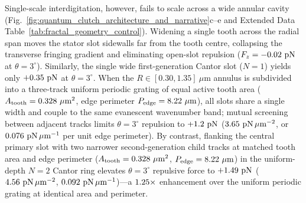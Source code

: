 \documentclass[pdflatex,sn-nature]{sn-jnl}
\DeclareRobustCommand{\roundtwo}[1]{\fpeval{round(#1,2)}}
\DeclareRobustCommand{\roundthree}[1]{\fpeval{round(#1,3)}}
\begin{document}
Single-scale interdigitation, however, fails to scale across a wide annular cavity (Fig.~\ref{fig:quantum_clutch_architecture_and_narrative}c--e and Extended Data Table~\ref{tab:fractal_geometry_control}). Widening a single tooth across the radial span moves the stator slot sidewalls far from the tooth centre, collapsing the transverse fringing gradient and eliminating open-slot repulsion ($F_z = \roundtwo{\CtrlSinglewideBemThetathreeFZPn}\text{ pN}$ at $\theta=3^\circ$). Similarly, the single wide first-generation Cantor slot ($N=1$) yields only $+\roundtwo{\FractalNoneFundringBemThetathreeFZPn}\text{ pN}$ at $\theta=3^\circ$. When the $R \in [0.30, 1.35]\ \mu\text{m}$ annulus is subdivided into a three-track uniform periodic grating of equal active tooth area ($A_{\rm tooth} = \roundthree{\FractalCtrlUniformperiodicActiveToothAreaUmtwo}\ \mu\text{m}^2$, edge perimeter $P_{\rm edge} = \roundtwo{\FractalCtrlUniformperiodicEdgePerimeterUm}\ \mu\text{m}$), all slots share a single width and couple to the same evanescent wavenumber band; mutual screening between adjacent tracks limits $\theta=3^\circ$ repulsion to $+\roundtwo{\CtrlUniformperiodicBemThetathreeFZPn}\text{ pN}$ ($\roundtwo{\NatureCtrlUniformperiodicFRepPnPerToothAreaUmtwo}\text{ pN}\,\mu\text{m}^{-2}$, or $\roundthree{\FractalCtrlUniformperiodicFRepPnPerUm}\text{ pN}\,\mu\text{m}^{-1}$ per unit edge perimeter). By contrast, flanking the central primary slot with two narrower second-generation child tracks at matched tooth area and edge perimeter ($A_{\rm tooth} = \roundthree{\FractalCantorFlatzActiveToothAreaUmtwo}\ \mu\text{m}^2$, $P_{\rm edge} = \roundtwo{\FractalCantorFlatzEdgePerimeterUm}\ \mu\text{m}$) in the uniform-depth $N=2$ Cantor ring elevates $\theta=3^\circ$ repulsive force to $+\roundtwo{\CantorNtwoFlatzBemThetathreeFZPn}\text{ pN}$ ($\roundtwo{\NatureCantorNtwoFlatzFRepPnPerToothAreaUmtwo}\text{ pN}\,\mu\text{m}^{-2}$, $\roundthree{\FractalCantorFlatzFRepPnPerUm}\text{ pN}\,\mu\text{m}^{-1}$)---a $1.25{}\times$ enhancement over the uniform periodic grating at identical area and perimeter.
\end{document}
